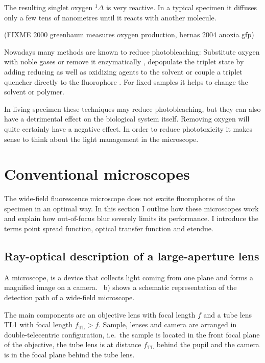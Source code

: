 The resulting singlet oxygen ${}^1\Delta$ is very reactive. In a
typical specimen it diffuses only a few tens of nanometres until it
reacts with another molecule.

(FIXME 2000 greenbaum measures oxygen production, bernas 2004 anoxia gfp)

Nowadays many methods are known to reduce photobleaching: Substitute
oxygen with noble gases or remove it enzymatically
\citep[p.~89]{Sauer2011}, depopulate the triplet state by adding
reducing as well as oxidizing agents to the solvent
\citep{Vogelsang2008} or couple a triplet quencher directly to the
fluorophore \citep[p.~19]{Sauer2011}. For fixed samples it helps to
change the solvent or polymer.
 
In living specimen these techniques may reduce photobleaching, but
they can also have a detrimental effect on the biological system
itself. Removing oxygen will quite certainly have a negative
effect. In order to reduce phototoxicity it makes sense to think about
the light management in the microscope.


\section{Conventional microscopes}
\begin{summary}
  The wide-field fluorescence microscope does not excite fluorophores
  of the specimen in an optimal way. In this section I outline how
  these microscopes work and explain how out-of-focus blur severely
  limits its performance. I introduce the terms point spread function,
  optical transfer function and etendue.
\end{summary}

\subsection{Ray-optical description of a large-aperture lens}

A microscope, is a device that collects light coming from one plane  
and forms a magnified image on a
camera. ~b) shows a schematic
representation of the detection path of a wide-field microscope.

The main components are an objective lens with focal length $f$ and a 
tube lens TL1 with focal length $f_\textrm{TL}>f$. Sample, lenses and
camera are arranged in double-telecentric configuration, i.e.\ the
sample is located in the front focal plane of the objective, the tube
lens is at distance $f_\textrm{TL}$ behind the pupil and the camera is
in the focal plane behind the tube lens.


